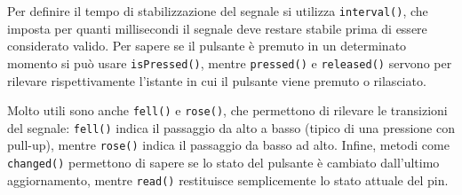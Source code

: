 Per definire il tempo di stabilizzazione del segnale si utilizza \texttt{interval()}, che imposta per quanti millisecondi il segnale deve restare stabile prima di essere considerato valido. Per sapere se il pulsante è premuto in un determinato momento si può usare \texttt{isPressed()}, mentre \texttt{pressed()} e \texttt{released()} servono per rilevare rispettivamente l’istante in cui il pulsante viene premuto o rilasciato.

Molto utili sono anche \texttt{fell()} e \texttt{rose()}, che permettono di rilevare le transizioni del segnale: \texttt{fell()} indica il passaggio da alto a basso (tipico di una pressione con pull-up), mentre \texttt{rose()} indica il passaggio da basso ad alto. Infine, metodi come \texttt{changed()} permettono di sapere se lo stato del pulsante è cambiato dall’ultimo aggiornamento, mentre \texttt{read()} restituisce semplicemente lo stato attuale del pin.